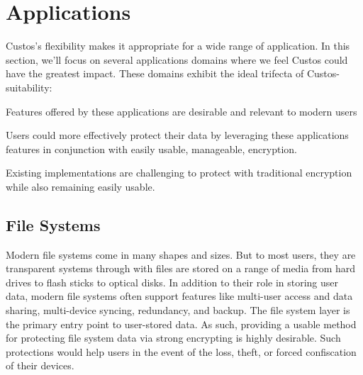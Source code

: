 \section{Applications}

Custos's flexibility makes it appropriate for a wide range of
application. In this section, we'll focus on several applications
domains where we feel Custos could have the greatest impact. These
domains exhibit the ideal trifecta of Custos-suitability:

\begin{packed_item}
\item Features offered by these applications are desirable and relevant
  to modern users
\item Users could more effectively protect their data by leveraging
  these applications features in conjunction with easily usable,
  manageable, encryption.
\item Existing implementations are challenging to protect with traditional
  encryption while also remaining easily usable.
\end{packed_item}

\subsection{File Systems}

Modern file systems come in many shapes and sizes. But to most users,
they are transparent systems through with files are stored on a range
of media from hard drives to flash sticks to optical disks. In
addition to their role in storing user data, modern file systems often
support features like multi-user access and data sharing, multi-device
syncing, redundancy, and backup. The file system layer is the primary
entry point to user-stored data. As such, providing a usable method
for protecting file system data via strong encrypting is highly
desirable. Such protections would help users in the event of the loss,
theft, or forced confiscation of their devices.

